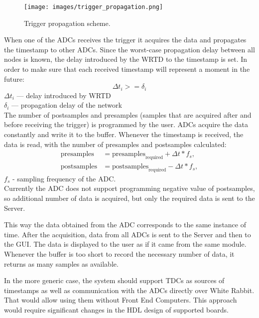 \documentclass[conference]{IEEEtran}
\begin{document}
\begin{figure}
\centerline{\texttt{[image: images/trigger\_propagation.png]}}
\caption{Trigger propagation scheme.}
\label{trig_prop}
\bigskip
\end{figure}


When one of the ADCs receives the trigger it acquires the data and propagates the timestamp to other ADCs. Since the worst-case propagation delay between all nodes is known, the delay introduced by the WRTD to the timestamp is set. In order to make sure that each received timestamp will represent a moment in the future:\\
\begin{equation}
\Delta t_i >= \delta_i
\end{equation}
$\Delta t_i$ ---  delay introduced by WRTD\\
$\delta_i $ ---  propagation delay of the network \\

The number of postsamples and presamples (samples that are acquired after and before receiving the trigger) is programmed by the user.
ADCs acquire the data constantly and write it to the buffer. Whenever the timestamp is received, the data is read, with the number of presamples and postsamples calculated:\\
\begin{align}
\text{presamples} & = \text{presamples}_\text{required} + \Delta t * f_s , \\
\text{postsamples} & = \text{postsamples}_\text{required} - \Delta t * f_s, 
\end{align} 
$f_s$ - sampling frequency of the ADC. \\
Currently the ADC does not support programming negative value of postsamples, so additional number of data is acquired, but only the required data is sent to the Server.

This way the data obtained from the ADC corresponds to the same instance of time. After the acquisition, data from all ADCs is sent to the Server and then to the GUI. The data is displayed to the user as if it came from the same module.
Whenever the buffer is too short to record the necessary number of data, it returns as many samples as available.

In the more generic case, the system should support TDCs as sources of timestamps as well as communication with the ADCs directly over White Rabbit. That would allow using them without Front End Computers. This approach would require significant changes in the HDL design of supported boards. 
\end{document}
